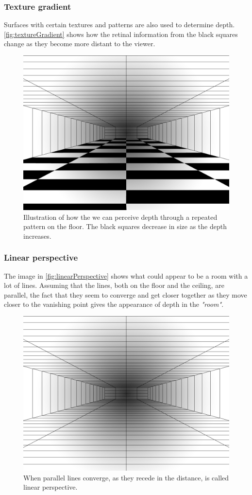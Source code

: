 \subsubsection{Texture gradient}
Surfaces with certain textures and patterns are also used to determine depth. \autoref{fig:textureGradient} shows how the retinal information from the black squares change as they become more distant to the viewer.
\citep[p.~201]{sensationPerception}
\begin{figure}[H]
	\centering
	\includegraphics[width=0.75\linewidth]{figure/Analysis/textureGradient.png}
	\caption{Illustration of how the we can perceive depth through a repeated pattern on the floor. The black squares decrease in size as the depth increases.}
	\label{fig:textureGradient}
\end{figure}

\subsubsection{Linear perspective}
The image in \autoref{fig:linearPerspective} shows what could appear to be a room with a lot of lines. Assuming that the lines, both on the floor and the ceiling, are parallel, the fact that they seem to converge and get closer together as they move closer to the vanishing point gives the appearance of depth in the \textit{"room"}\citep[p.~201]{sensationPerception}.
\begin{figure}[H]
	\centering
	\includegraphics[width=0.75\linewidth]{figure/Analysis/linearPerspective.png}
	\caption{When parallel lines converge, as they recede in the distance, is called linear perspective.}
	\label{fig:linearPerspective}
\end{figure}

